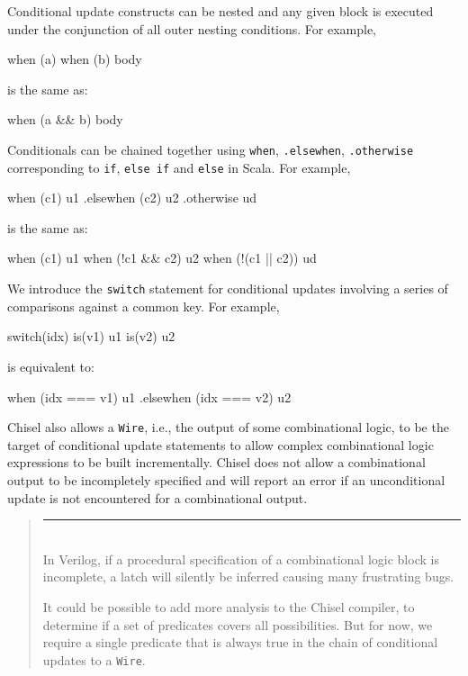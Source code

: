 \documentclass[twocolumn,10pt]{article}
\newenvironment{commentary}
{ \vspace{-0.1in}
  \begin{quotation}
  \noindent
  \small \em
  \rule{\linewidth}{1pt}\\
}
{
  \end{quotation}
}
\def\code#1{{\tt #1}}
\begin{document}
Conditional update constructs can be nested and any given block is
executed under the conjunction of all outer nesting conditions.  For
example,
\begin{scala}
when (a) { when (b) { body } }
\end{scala}

\noindent
is the same as:
\begin{scala}
when (a && b) { body }
\end{scala}

Conditionals can be chained together using
\verb+when+, \verb+.elsewhen+, \verb+.otherwise+ corresponding to
\verb+if+, \verb+else if+ and \verb+else+ in Scala.  For example,
\begin{scala}
when (c1) { u1 }
.elsewhen (c2) { u2 }
.otherwise { ud }
\end{scala}
\noindent
is the same as:
\begin{scala}
when (c1) { u1 }
when (!c1 && c2) { u2 }
when (!(c1 || c2)) { ud }
\end{scala}

We introduce the \code{switch} statement for conditional updates
involving a series of comparisons against a common key.  For example,
\begin{scala}
switch(idx) {
 is(v1) { u1 }
 is(v2) { u2 }
}
\end{scala}

\noindent
is equivalent to:
\begin{scala}
when (idx === v1) { u1 }
.elsewhen (idx === v2) { u2 }
\end{scala}

Chisel also allows a \code{Wire}, i.e., the output of some
combinational logic, to be the target of conditional update statements
to allow complex combinational logic expressions to be built
incrementally.  Chisel does not allow a combinational output to be
incompletely specified and will report an error if an unconditional
update is not encountered for a combinational output.
\begin{commentary}
In Verilog, if a procedural specification of a combinational logic
block is incomplete, a latch will silently be inferred causing many
frustrating bugs.

It could be possible to add more analysis to the Chisel compiler, to
determine if a set of predicates covers all possibilities.  But for
now, we require a single predicate that is always true in the
chain of conditional updates to a \code{Wire}.
\end{commentary}
\end{document}
